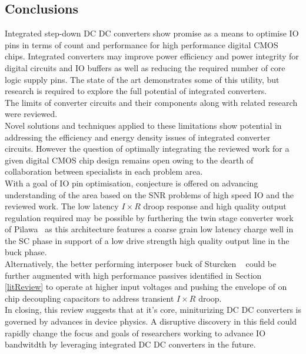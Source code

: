 \documentclass[letterpaper,twocolumn,10pt]{article}
\begin{document}
\subsection{Conclusions}

Integrated step-down DC DC converters show promise as a means to optimise IO pins in terms of count and performance for high performance digital CMOS chips. Integrated converters may improve power efficiency and power integrity for digital circuits and IO buffers as well as reducing the required number of core logic supply pins. The state of the art demonstrates some of this utility, but research is required to explore the full potential of integrated converters.\\  
The limits of converter circuits and their components along with related research were reviewed.\\
Novel solutions and techniques applied to these limitations show potential in addressing the efficiency and energy density issues of integrated converter circuits. However the question of optimally integrating the reviewed work for a given digital CMOS chip design remains open owing to the dearth of collaboration between specialists in each problem area.\\
\indent With a goal of IO pin optimisation, conjecture is offered on advancing understanding of the area based on the SNR problems of high speed IO and the reviewed work. The low latency $I \times R$ droop response and high quality output regulation required may be possible by furthering the twin stage converter work of Pilawa~\cite{Pilawa2012} as this architecture features a coarse grain low latency charge well in the SC phase in support of a low drive strength high quality output line in the buck phase.\\
Alternatively, the better performing interposer buck of Sturcken ~\cite{Sturcken2013} could be further augmented with high performance passives identified in Section \ref{litReview} to operate at higher input voltages and pushing the envelope of on chip decoupling capacitors to address transient $I \times R$ droop.\\
In closing, this review suggests that at it's core, miniturizing DC DC converters is governed by advances in device physics. A disruptive discovery in this field could rapidly change the focus and goals of researchers working to advance IO bandwitdth by leveraging integrated DC DC converters in the future.      


{\footnotesize 
}


\theendnotes
\end{document}
